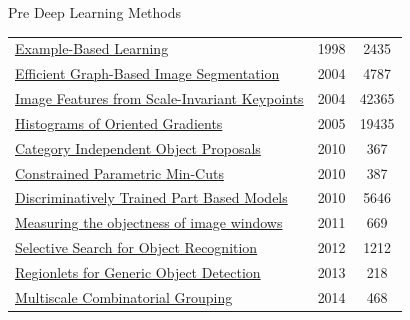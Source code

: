 \documentclass[handout]{beamer}
\begin{document}
\begin{frame}{Pre Deep Learning Methods}
\begin{tabular}{lcc}
	\href{http://www.vision.caltech.edu/CNS179/papers/Poggio98.pdf}{\color{blue}Example-Based Learning} \dotfill&1998 & 2435 \\
	\href{http://fcv2011.ulsan.ac.kr/files/announcement/413/IJCV(2004)\%20Efficient\%20Graph-Based\%20Image\%20Segmentation.pdf}{\color{blue}Efficient Graph-Based Image Segmentation} \dotfill& 2004 & 4787 \\
	\href{www.robots.ox.ac.uk/~vgg/research/affine/det_eval_files/lowe_ijcv2004.pdf}{\color{blue}Image Features from Scale-Invariant Keypoints} \dotfill  & 2004 & 42365 \\
	\href{https://hal.inria.fr/file/index/docid/548512/filename/hog_cvpr2005.pdf}{\color{blue}Histograms of Oriented Gradients} \dotfill& 2005 & 19435 \\
	\href{http://dhoiem.web.engr.illinois.edu/publications/eccv2010_CategoryIndependentProposals_ian.pdf}{\color{blue}Category Independent Object Proposals} \dotfill& 2010 & 367 \\
	\href{https://pdfs.semanticscholar.org/648a/ccff91feda12ece4cdbde713bb3f7fc54045.pdf}{\color{blue}Constrained Parametric Min-Cuts} \dotfill & 2010 & 387 \\
	\href{https://cs.brown.edu/~pff/papers/lsvm-pami.pdf}{\color{blue}Discriminatively Trained Part Based Models} \dotfill& 2010 & 5646 \\
	\href{http://ai2-s2-pdfs.s3.amazonaws.com/b967/9890b45ddc60234a158eb83926c5a392bd4a.pdf}{\color{blue}Measuring the objectness of image windows} \dotfill & 2011 & 669 \\
	\href{https://ivi.fnwi.uva.nl/isis/publications/bibtexbrowser.php?key=UijlingsIJCV2013\&bib=all.bib}{\color{blue}Selective Search for Object Recognition}\dotfill & 2012 & 1212 \\
	\href{http://www.ece.northwestern.edu/~mya671/mypapers/ICCV13_Wang_Yang_Zhu_Lin.pdf}{\color{blue}Regionlets for Generic Object Detection} \dotfill & 2013 & 218 \\
	\href{http://www.cv-foundation.org/openaccess/content_cvpr_2014/papers/Arbelaez_Multiscale_Combinatorial_Grouping_2014_CVPR_paper.pdf}{\color{blue}Multiscale Combinatorial Grouping} \dotfill & 2014 & 468 \\
\end{tabular}
\end{frame}
\end{document}
